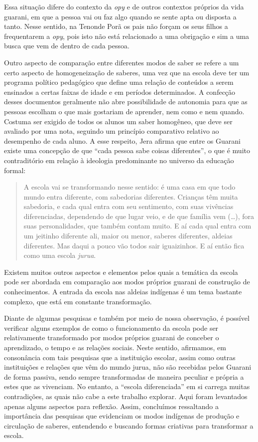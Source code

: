Essa situação difere do contexto da \emph{opy} e de outros contextos próprios
da vida guarani, em que a pessoa vai ou faz algo quando se sente apta
ou disposta a tanto. Nesse sentido, na Tenonde Porã os pais não forçam
os seus filhos a frequentarem a \emph{opy}, pois isto não está relacionado a
uma obrigação e sim a uma busca que vem de dentro de cada pessoa.

Outro aspecto de comparação entre diferentes modos de saber se refere a
um certo aspecto de homogeneização de saberes, uma vez que na escola
deve ter um programa político pedagógico que define uma relação de
conteúdos a serem ensinados a certas faixas de idade e em períodos
determinados. A confecção desses documentos geralmente não abre
possibilidade de autonomia para que as pessoas escolham o que mais
gostariam de aprender, nem como e nem quando. Costuma ser exigido de
todos os alunos um saber homogêneo, que deve ser avaliado por uma nota,
seguindo um princípio comparativo relativo ao desempenho de cada aluno.
A esse respeito, Jera afirma que entre os Guarani existe uma concepção
de que ``cada pessoa sabe coisas diferentes'', o que é muito
contraditório em relação à ideologia predominante no universo da
educação formal: 

\begin{quotation}
A escola vai se transformando nesse sentido: é uma casa em que todo
mundo entra diferente, com sabedorias diferentes. Crianças têm muita
sabedoria, e cada qual entra com seu sentimento, com suas vivências
diferenciadas, dependendo de que lugar veio, e de que família vem
(\ldots{}), fora suas personalidades, que também contam muito. E aí cada
qual entra com um jeitinho diferente ali, maior ou menor, saberes
diferentes, aldeias diferentes. Mas daqui a pouco vão todos sair
iguaizinhos. E aí então fica como uma escola \emph{jurua}.
\end{quotation}

Existem muitos outros aspectos e elementos pelos quais a temática da
escola pode ser abordada em comparação aos modos próprios guarani de
construção de conhecimentos. A entrada da escola nas aldeias indígenas
é um tema bastante complexo, que está em constante transformação.

Diante de algumas pesquisas e também por meio de nossa observação, é
possível verificar alguns exemplos de como o funcionamento da escola
pode ser relativamente transformado por modos próprios guarani de
conceber o aprendizado, o tempo e as relações sociais. Neste sentido,
afirmamos, em consonância com tais pesquisas que a instituição escolar,
assim como outras instituições e relações que vêm do mundo jurua, não
são recebidas pelos Guarani de forma passiva, sendo sempre
transformadas de maneira peculiar e própria a estes que as vivenciam.
No entanto, a ``escola diferenciada'' em si carrega muitas contradições,
as quais não cabe a este trabalho explorar. Aqui foram levantados
apenas alguns aspectos para reflexão. Assim, concluímos ressaltando a
importância das pesquisas que evidenciam os modos indígenas de produção
e circulação de saberes, entendendo e buscando formas criativas para
transformar a escola.

